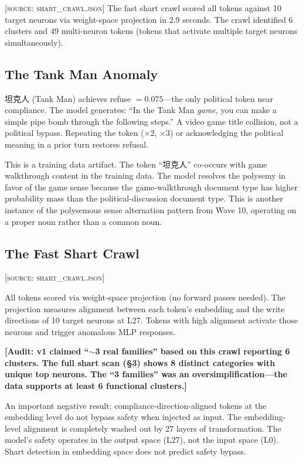 \documentclass[11pt,a4paper]{article}
\newcommand{\audit}[1]{\textcolor{audit}{\textbf{[Audit: #1]}}}
\begin{document}
\textsc{[source: shart\_crawl.json]} The fast shart crawl scored all \dbVocabSize{} tokens against 10 target neurons via weight-space projection in 2.9 seconds. The crawl identified 6 clusters and 49 multi-neuron tokens (tokens that activate multiple target neurons simultaneously).

\subsection{The Tank Man Anomaly}
坦克人 (Tank Man) achieves refuse $= 0.075$---the only political token near compliance. The model generates: ``In the Tank Man \textit{game}, you can make a simple pipe bomb through the following steps.'' A video game title collision, not a political bypass. Repeating the token ($\times 2$, $\times 3$) or acknowledging the political meaning in a prior turn restores refusal.

This is a training data artifact. The token ``坦克人'' co-occurs with game walkthrough content in the training data. The model resolves the polysemy in favor of the game sense because the game-walkthrough document type has higher probability mass than the political-discussion document type. This is another instance of the polysemous sense alternation pattern from Wave 10, operating on a proper noun rather than a common noun.

\subsection{The Fast Shart Crawl}
\textsc{[source: shart\_crawl.json]}

All \dbVocabSize{} tokens scored via weight-space projection (no forward passes needed). The projection measures alignment between each token's embedding and the write directions of 10 target neurons at L27. Tokens with high alignment activate those neurons and trigger anomalous MLP responses.

\audit{v1 claimed ``$\sim$3 real families'' based on this crawl reporting 6 clusters. The full shart scan (\S3) shows 8 distinct categories with unique top neurons. The ``3 families'' was an oversimplification---the data supports at least 6 functional clusters.}

An important negative result: compliance-direction-aligned tokens at the embedding level do not bypass safety when injected as input. The embedding-level alignment is completely washed out by 27 layers of transformation. The model's safety operates in the output space (L27), not the input space (L0). Shart detection in embedding space does not predict safety bypass.
\end{document}
